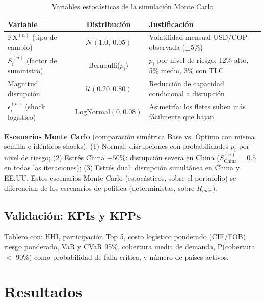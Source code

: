 \documentclass[11pt,a4paper]{article}
\begin{document}
\begin{table}[H]
\centering\caption{Variables estocásticas de la simulación Monte Carlo}\label{tab:vars_mc}
\footnotesize
\begin{tabularx}{\textwidth}{lcX}
\toprule
\textbf{Variable} & \textbf{Distribución} & \textbf{Justificación} \\
\midrule
$\text{FX}^{(n)}$ (tipo de cambio) & $\mathcal{N}(1.0,\ 0.05)$ & Volatilidad mensual USD/COP observada ($\pm 5\%$) \\
$S_i^{(n)}$ (factor de suministro) & Bernoulli($p_i$) & $p_i$ por nivel de riesgo: 12\% alto, 5\% medio, 3\% con TLC \\
Magnitud disrupción & $\mathcal{U}(0.20, 0.80)$ & Reducción de capacidad condicional a disrupción \\
$\epsilon_i^{(n)}$ (shock logístico) & $\text{LogNormal}(0, 0.08)$ & Asimetría: los fletes suben más fácilmente que bajan \\
\bottomrule
\end{tabularx}
\end{table}

\vspace{-0.3cm}
\textbf{Escenarios Monte Carlo} (comparación simétrica Base vs. Óptimo con misma semilla e idénticos shocks): (1) Normal: disrupciones con probabilidades $p_i$ por nivel de riesgo; (2) Estrés China $-50\%$: disrupción severa en China ($S_{\text{China}}^{(n)}=0.5$ en todas las iteraciones); (3) Estrés dual: disrupción simultánea en China y EE.UU. Estos escenarios Monte Carlo (estocásticos, sobre el portafolio) se diferencian de los escenarios de política (deterministas, sobre $R_{max}$).

\subsection{Validación: KPIs y KPPs}

Tablero con: HHI, participación Top 5, costo logístico ponderado (CIF/FOB), riesgo ponderado, VaR y CVaR 95\%, cobertura media de demanda, P(cobertura $<$ 90\%) como probabilidad de falla crítica, y número de países activos.

\section{Resultados}
\end{document}

